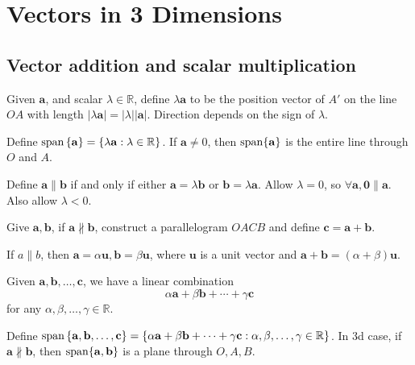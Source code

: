 \documentclass[a4paper]{article}
\begin{document}
\section{Vectors in 3 Dimensions}
\subsection{Vector addition and scalar multiplication}
\begin{definition}
  Given $ \mathbf{a} $, and scalar $ \lambda\in \mathbb{R} $, define
  $ \lambda \mathbf{a} $ to be the position vector of $ A' $ on the
  line $OA$ with length $ |\lambda \mathbf{a}|=\left| \lambda \right|
  \left| \mathbf{a} \right|  $. Direction depends on the sign of $ \lambda $.
\end{definition}
Define $ \operatorname{span}\left\{ \mathbf{a}\right\} = \left\{ \lambda \mathbf{a}:
\lambda\in \mathbb{R} \right\} $. If $ \mathbf{a}\neq 0 $, then $
\operatorname{span} \{\mathbf{a}\} $ is the entire line through $O$ and $A$.

Define $ \mathbf{a} \parallel \mathbf{b} $ if and only if either $
\mathbf{a} = \lambda \mathbf{b} $ or $ \mathbf{b} = \lambda
\mathbf{a} $. Allow $ \lambda=0 $, so $\forall \mathbf{a}, \mathbf{0}
\parallel \mathbf{a} $. Also allow $\lambda<0$.
\begin{definition}
  Give $ \mathbf{a}, \mathbf{b} $, if $ \mathbf{a} \nparallel
  \mathbf{b} $, construct a parallelogram $OACB$ and define $
  \mathbf{c} = \mathbf{a} + \mathbf{b} $.
\end{definition}
If $ a \parallel b $, then $ \mathbf{a} = \alpha \mathbf{u},
\mathbf{b}=\beta \mathbf{u} $, where $\mathbf{u}$ is a unit vector
and $ \mathbf{a}+\mathbf{b}=(\alpha+\beta)\mathbf{u} $.

Given $ \mathbf{a},\mathbf{b},\dots,\mathbf{c} $, we have a linear combination
\[
  \alpha \mathbf{a}+ \beta \mathbf{b}+\cdots+\gamma \mathbf{c}
\]
for any $ \alpha,\beta,\dots, \gamma\in \mathbb{R}  $.

Define $ \operatorname{span} \left\{ \mathbf{a},\mathbf{b},\dots,\mathbf{c}\right\}
= \left\{ \alpha \mathbf{a}+ \beta \mathbf{b}+\cdots+\gamma
\mathbf{c}:\alpha,\beta,\dots, \gamma\in \mathbb{R} \right\} $. In 3d
case, if $ \mathbf{a} \nparallel \mathbf{b} $, then $ \operatorname{span} \{
\mathbf{a}, \mathbf{b} \} $ is a plane through $O,A,B$.
\end{document}
